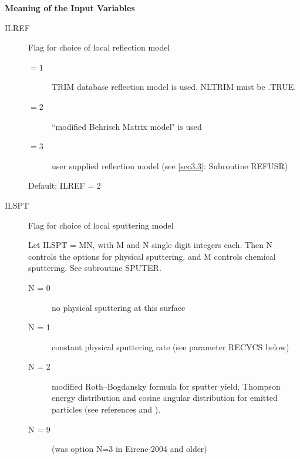 \textbf{Meaning of the Input Variables} 

\medskip 

\begin{description}
  \item[ILREF] Flag for choice of local reflection model
        \begin{description}
          \item[$= 1$] TRIM database reflection model is used.
                NLTRIM must be .TRUE.
          \item[$= 2$] ``modified Behrisch Matrix model" is used
          \item[$= 3$] user
                supplied reflection model (see \cref{sec3.3}:
                Subroutine REFUSR)
        \end{description}

        Default: ILREF = 2
  \item[ILSPT] Flag for choice of local sputtering model

        Let ILSPT = MN, with M and N single digit integers each.
        Then N controls the options for physical sputtering, and M controls chemical
        sputtering.
        See subroutine SPUTER.
        \begin{description}
          \item[N = 0] no physical sputtering at this surface
          \item[N = 1] constant
                physical sputtering rate (see parameter RECYCS below)
          \item[N = 2] modified
                Roth--Bogdansky formula for sputter yield, Thompson energy distribution and
                cosine angular distribution for emitted particles (see references
                \cite{kn:Sputer95} and \cite{kn:Roth96}).
          \item[N = 9] (was option N=3 in Eirene-2004 and older) 


\end{description}
\end{description}
